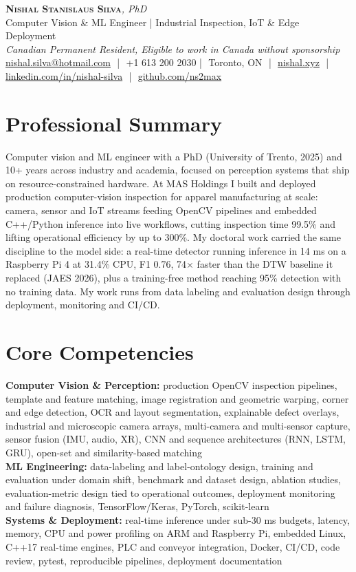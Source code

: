 \documentclass[11pt]{article}
\makeatletter
\newcommand{\cvName}{Nishal Stanislaus Silva}
\newcommand{\cvEmail}{nishal.silva@hotmail.com}
\newcommand{\cvPhone}{+1 613 200 2030}
\newcommand{\cvCity}{Toronto, ON}
\newcommand{\cvSite}{https://nishal.xyz}
\newcommand{\cvLinkedIn}{https://www.linkedin.com/in/nishal-silva}
\newcommand{\cvGitHub}{https://github.com/ns2max}
\newcommand{\cvStatus}{Canadian Permanent Resident, Eligible to work in Canada without sponsorship}
\newcommand{\cvTagline}{Computer Vision \& ML Engineer | Industrial Inspection, IoT \& Edge Deployment}
\makeatother
\begin{document}
\pagestyle{empty}
\begin{center}
    {\LARGE \scshape \textbf{\cvName}}{\large \textit{, PhD}}\\[1pt]
    {\small \cvTagline}\\[1pt]
    {\footnotesize\textit{\cvStatus}}\\[1pt]
    {\small
    \href{mailto:\cvEmail}{\cvEmail} \,\,|\,\, \cvPhone \,\,|\,\, \cvCity
    \,\,|\,\, \href{\cvSite}{nishal.xyz} \,\,|\,\, \href{\cvLinkedIn}{linkedin.com/in/nishal-silva}
    \,\,|\,\, \href{\cvGitHub}{github.com/ns2max}}
\end{center}

\section*{Professional Summary}

Computer vision and ML engineer with a PhD (University of Trento, 2025) and 10+ years across industry and academia, focused on perception systems that ship on resource-constrained hardware. At MAS Holdings I built and deployed production computer-vision inspection for apparel manufacturing at scale: camera, sensor and IoT streams feeding OpenCV pipelines and embedded C++/Python inference into live workflows, cutting inspection time 99.5\% and lifting operational efficiency by up to 300\%. My doctoral work carried the same discipline to the model side: a real-time detector running inference in 14 ms on a Raspberry Pi 4 at 31.4\% CPU, F1 0.76, 74$\times$ faster than the DTW baseline it replaced (JAES 2026), plus a training-free method reaching 95\% detection with no training data. My work runs from data labeling and evaluation design through deployment, monitoring and CI/CD.

\section*{Core Competencies}

\textbf{Computer Vision \& Perception:} production OpenCV inspection pipelines, template and feature matching, image registration and geometric warping, corner and edge detection, OCR and layout segmentation, explainable defect overlays, industrial and microscopic camera arrays, multi-camera and multi-sensor capture, sensor fusion (IMU, audio, XR), CNN and sequence architectures (RNN, LSTM, GRU), open-set and similarity-based matching\\
\textbf{ML Engineering:} data-labeling and label-ontology design, training and evaluation under domain shift, benchmark and dataset design, ablation studies, evaluation-metric design tied to operational outcomes, deployment monitoring and failure diagnosis, TensorFlow/Keras, PyTorch, scikit-learn\\
\textbf{Systems \& Deployment:} real-time inference under sub-30 ms budgets, latency, memory, CPU and power profiling on ARM and Raspberry Pi, embedded Linux, C++17 real-time engines, PLC and conveyor integration, Docker, CI/CD, code review, pytest, reproducible pipelines, deployment documentation
\end{document}
